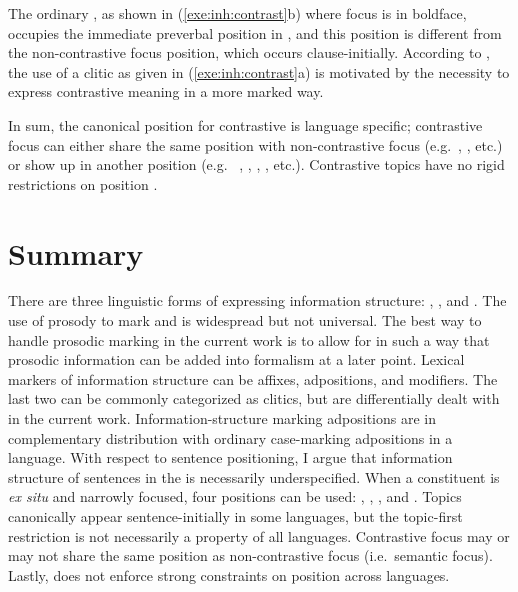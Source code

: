 \noindent The ordinary , as shown in
(\ref{exe:inh:contrast}b) where focus is in boldface, occupies the
immediate preverbal position in , and this position is
different from the non-contrastive focus position, which occurs
clause-initially.  According to \citeauthor{nichols:11}, the use of a
clitic as given in (\ref{exe:inh:contrast}a) is motivated by the
necessity to express contrastive meaning in a more marked way.



In sum, the canonical position for contrastive  is language
specific; contrastive focus can either share the same position with
non-contrastive focus (e.g.\ ,  \citep{gryllia:09},
etc.)  or show up in another position (e.g.\ 
\citep{ambar:99},  \citep{neeleman:titov:09},
 \citep{skopeteas:fanselow:10}, 
\citep{nichols:11}, etc.). Contrastive topics have no rigid
restrictions on position \citep{erteschik:07,bianchi:frascarelli:10}.





\section{Summary}
\label{4:sec:summary}


There are three linguistic forms of expressing information structure:
,  , and . 
The use of prosody to mark  and
 is widespread but not universal. The best way to handle prosodic
marking in the current work is to allow for 
in such a way that prosodic information can be added into formalism at
a later point. Lexical markers of information structure
can be affixes, adpositions, and modifiers. The last two can be
commonly categorized as clitics, but are differentially dealt with in
the current work. Information-structure marking adpositions are in
complementary distribution with ordinary case-marking adpositions in a
language. With respect to sentence positioning, I argue that
information structure of sentences in the  is
necessarily underspecified. When a constituent is \textit{ex situ} and
narrowly focused, four positions can be used: ,
, , and .  Topics
canonically appear sentence-initially in some languages, but the
topic-first restriction is not necessarily a property of all
languages. Contrastive focus may or may not share the same position as
non-contrastive focus (i.e.\ semantic focus).
Lastly,  does not enforce strong 
constraints on position across languages.

